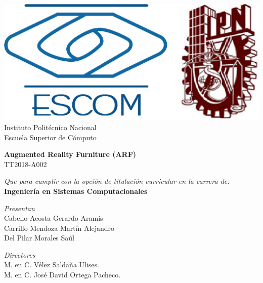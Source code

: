 
\begin{titlepage}

    \centering %

    \includegraphics[scale=0.17]{imagenes/escom-ipn} %
    \LARGE{\\ Instituto Polit\'ecnico Nacional}
    \LARGE{\\ Escuela Superior de C\'omputo}
    
    \vspace{1cm} %

    \LARGE \textbf{Augmented Reality Furniture (ARF)}
    \LARGE {\\ TT2018-A002}

    \vspace{1cm} %

    \LARGE \textit{Que para cumplir con la opción de titulación curricular en la carrera de:}
    \LARGE \textbf{\\ Ingeniería en Sistemas Computacionales}

    \vspace{1cm} %

   \textit{Presentan}\\
    Cabello Acosta Gerardo Aramis\\
    Carrillo Mendoza Martín Alejandro \\
    Del Pilar Morales Saúl

    \vspace{1cm} %

   \textit{Directores}\\
    M. en C. Vélez Saldaña Ulises. \bigskip  \\
    M. en C. José David Ortega Pacheco. \bigskip  
\end{titlepage}